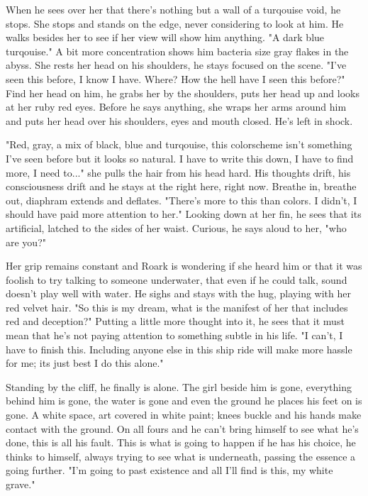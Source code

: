        When he sees over her that there's nothing but a wall of a turqouise void, he stops. She stops and stands on the edge, never considering
    to look at him. He walks besides her to see if her view will show him anything. "A dark blue turqouise." A bit more concentration shows him
    bacteria size gray flakes in the abyss. She rests her head on his shoulders, he stays focused on the scene. "I've seen this before, I know
    I have. Where? How the hell have I seen this before?" Find her head on him, he grabs her by the shoulders, puts her head up and looks at her
    ruby red eyes. Before he says anything, she wraps her arms around him and puts her head over his shoulders, eyes and mouth closed. He's
    left in shock.

        "Red, gray, a mix of black, blue and turqouise, this colorscheme isn't something I've seen before but it looks so natural. I have to
    write this down, I have to find more, I need to..." she pulls the hair from his head hard. His thoughts drift, his consciousness drift and
    he stays at the right here, right now. Breathe in, breathe out, diaphram extends and deflates. "There's more to this than colors. I didn't,
    I should have paid more attention to her." Looking down at her fin, he sees that its artificial, latched to the sides of her waist. Curious,
    he says aloud to her, "who are you?" 

        Her grip remains constant and Roark is wondering if she heard him or that it was foolish to try talking to someone underwater, that even
    if he could talk, sound doesn't play well with water. He sighs and stays with the hug, playing with her red velvet hair. "So this is my dream,
    what is the manifest of her that includes red and deception?" Putting a little more thought into it, he sees that it must mean that he's
    not paying attention to something subtle in his life. "I can't, I have to finish this. Including anyone else in this ship ride will make
    more hassle for me; its just best I do this alone."

        Standing by the cliff, he finally is alone. The girl beside him is gone, everything behind him is gone, the water is gone and even the
    ground he places his feet on is gone. A white space, art covered in white paint; knees buckle and his hands make contact with the ground.
    On all fours and he can't bring himself to see what he's done, this is all his fault. This is what is going to happen if he has his choice,
    he thinks to himself, always trying to see what is underneath, passing the essence a going further. "I'm going to past existence and all
    I'll find is this, my white grave."

